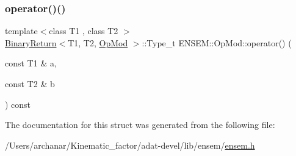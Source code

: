 \subsubsection{\texorpdfstring{operator()()}{operator()()}\hspace{0.1cm}{\footnotesize\ttfamily [3/3]}}
{\footnotesize\ttfamily template$<$class T1 , class T2 $>$ \\
\mbox{\hyperlink{structENSEM_1_1BinaryReturn}{Binary\+Return}}$<$T1, T2, \mbox{\hyperlink{structENSEM_1_1OpMod}{Op\+Mod}} $>$\+::Type\+\_\+t E\+N\+S\+E\+M\+::\+Op\+Mod\+::operator() (\begin{DoxyParamCaption}\item[{const T1 \&}]{a,  }\item[{const T2 \&}]{b }\end{DoxyParamCaption}) const\hspace{0.3cm}{\ttfamily [inline]}}



The documentation for this struct was generated from the following file\+:\begin{DoxyCompactItemize}
\item 
/\+Users/archanar/\+Kinematic\+\_\+factor/adat-\/devel/lib/ensem/\mbox{\hyperlink{adat-devel_2lib_2ensem_2ensem_8h}{ensem.\+h}}\end{DoxyCompactItemize}
